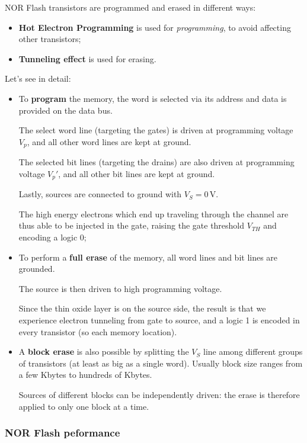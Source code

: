 \documentclass[a4paper,11pt]{article}
\begin{document}
NOR Flash transistors are programmed and erased in different ways:
\begin{itemize}
	\item \textbf{Hot Electron Programming} is used for \textit{programming}, to avoid affecting other transistors;
	\item \textbf{Tunneling effect} is used for erasing.
\end{itemize}

Let's see in detail:

\begin{itemize}
	\item To \textbf{program} the memory, the word is selected via its address and data is provided on the data bus.

	      The select word line (targeting the gates) is driven at programming voltage $V_p$, and all other word lines are kept at ground.

	      The selected bit lines (targeting the drains) are also driven at programming voltage $V_p'$, and all other bit lines are kept at ground.

	      Lastly, sources are connected to ground with $V_S = 0 \, \mathrm{V}$.

	      The high energy electrons which end up traveling through the channel are thus able to be injected in the gate, raising the gate threshold $V_{TH}$ and encoding a logic 0;

	\item To perform a \textbf{full erase} of the memory, all word lines and bit lines are grounded.

	      The source is then driven to high programming voltage.

	      Since the thin oxide layer is on the source side, the result is that we experience electron tunneling from gate to source, and a logic 1 is encoded in every transistor (so each memory location).

	\item A \textbf{block erase} is also possible by splitting the $V_S$ line among different groups of transistors (at least as big as a single word).
	      Usually block size ranges from a few Kbytes to hundreds of Kbytes.

	      Sources of different blocks can be independently driven: the erase is therefore applied to only one block at a time.
\end{itemize}

\subsubsection{NOR Flash peformance}
\end{document}
